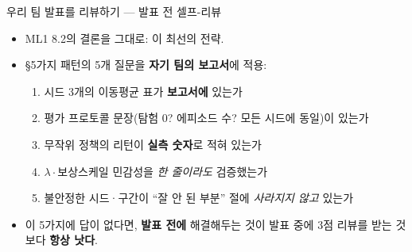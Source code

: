 \begin{frame}{우리 팀 발표를 리뷰하기 — 발표 전 셀프-리뷰}
  \begin{itemize}
    \item ML1 8.2의 결론을 그대로: 이 최선의 전략.
    \item §5가지 패턴의 5개 질문을 \textbf{자기 팀의 보고서}에 적용:
      \begin{enumerate}
        \item 시드 3개의 이동평균 표가 \textbf{보고서에} 있는가
        \item 평가 프로토콜 문장(탐험 0? 에피소드 수? 모든 시드에 동일)이
          있는가
        \item 무작위 정책의 리턴이 \textbf{실측 숫자}로 적혀 있는가
        \item $\lambda\cdot$보상스케일 민감성을 \emph{한 줄이라도}
          검증했는가
        \item 불안정한 시드·구간이 ``잘 안 된 부분'' 절에 \emph{사라지지
          않고} 있는가
      \end{enumerate}
    \item 이 5가지에 답이 없다면, \textbf{발표 전에} 해결해두는 것이
      발표 중에 3점 리뷰를 받는 것보다 \textbf{항상 낫다}.
  \end{itemize}
\end{frame}
